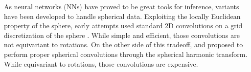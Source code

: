 \documentclass{article} %
\begin{document}

As neural networks (NNs) have proved to be great tools for inference, variants have been developed to handle spherical data.
Exploiting the locally Euclidean property of the sphere, early attempts used standard 2D convolutions on a grid discretization of the sphere \citep{boomsma2017sphericalcnn, su2017sphericalcnn, coors2018sphericalcnn}.
While simple and efficient, those convolutions are not equivariant to rotations.
On the other side of this tradeoff, \citet{cohen2018sphericalcnn} and \citet{esteves2018sphericalcnn} proposed to perform proper spherical convolutions through the spherical harmonic transform.
While equivariant to rotations, those convolutions are expensive.

\end{document}
